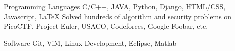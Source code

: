 

\begin{cvskills}

  \cvskill
    {Programming Languages} %
    {C/C++, JAVA, Python, Django, HTML/CSS, Javascript, LaTeX \newline
    Solved hundreds of algorithm and security problems on PicoCTF, Project Euler, USACO, Codeforces, Google Foobar, etc.} %

 \cvskill
    {Software} %
    {Git, ViM, Linux Development, Eclipse, Matlab} %

%
%
%
%



\end{cvskills}
